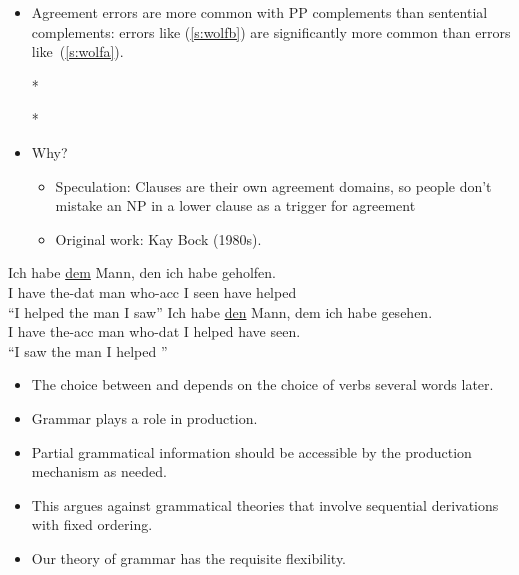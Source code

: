 \documentclass[a4paper,landscape,headrule,footrule,dvips]{foils}
\begin{document}

\begin{itemize}
\item Agreement errors are more common with PP complements than
  sentential complements: errors like (\ref{s:wolfb}) are
  significantly more common than errors like~(\ref{s:wolfa}).
  \begin{exe}
    \ex\label{s:wolfa} *
    
    \ex\label{s:wolfb} *
  \end{exe}
\item Why?
  \begin{itemize}
  \item Speculation: Clauses are their own 
    agreement domains, so people don’t 
    mistake an NP in a lower clause as a trigger 
    for agreement
  \item Original work: Kay Bock (1980s).
  \end{itemize}
\end{itemize}


\begin{exe}
\item\gll Ich habe   \ul{dem}  Mann,  den    ich  habe geholfen. \\
I   have  the-dat man who-acc I   seen      have   helped\\
\trans    “I helped the man I saw”
\ex \gll Ich habe   \ul{den}   Mann,  dem    ich  habe gesehen.\\
    I   have the-acc man  who-dat I    helped    have   seen.\\
\trans    “I saw the man I helped ”
\end{exe}
\begin{itemize}
\item The choice between  and  depends on the choice of 
  verbs several words later.
\end{itemize}



\begin{itemize}
\item Grammar plays a role in production.
\item Partial grammatical information should be accessible by 
the production mechanism as needed.
\item This argues against grammatical theories that involve 
sequential derivations with fixed ordering.
\item Our theory of grammar has the requisite flexibility.
\end{itemize}
\end{document}
